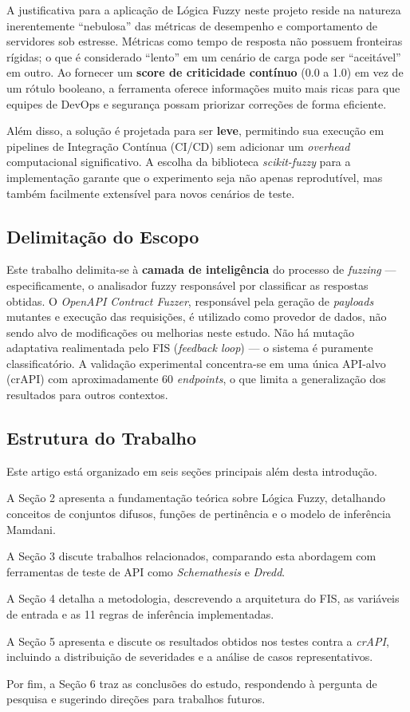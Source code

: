 A justificativa para a aplicação de Lógica Fuzzy neste projeto reside na natureza inerentemente ``nebulosa'' das métricas de desempenho e comportamento de servidores sob estresse. Métricas como tempo de resposta não possuem fronteiras rígidas; o que é considerado ``lento'' em um cenário de carga pode ser ``aceitável'' em outro. Ao fornecer um \textbf{score de criticidade contínuo} (0.0 a 1.0) em vez de um rótulo booleano, a ferramenta oferece informações muito mais ricas para que equipes de DevOps e segurança possam priorizar correções de forma eficiente.

Além disso, a solução é projetada para ser \textbf{leve}, permitindo sua execução em pipelines de Integração Contínua (CI/CD) sem adicionar um \textit{overhead} computacional significativo. A escolha da biblioteca \textit{scikit-fuzzy} para a implementação garante que o experimento seja não apenas reprodutível, mas também facilmente extensível para novos cenários de teste.

\subsection{Delimitação do Escopo}

Este trabalho delimita-se à \textbf{camada de inteligência} do processo de \textit{fuzzing} --- especificamente, o analisador fuzzy responsável por classificar as respostas obtidas. O \textit{OpenAPI Contract Fuzzer}, responsável pela geração de \textit{payloads} mutantes e execução das requisições, é utilizado como provedor de dados, não sendo alvo de modificações ou melhorias neste estudo. Não há mutação adaptativa realimentada pelo FIS (\textit{feedback loop}) --- o sistema é puramente classificatório. A validação experimental concentra-se em uma única API-alvo (crAPI) com aproximadamente 60 \textit{endpoints}, o que limita a generalização dos resultados para outros contextos.

\subsection{Estrutura do Trabalho}

Este artigo está organizado em seis seções principais além desta introdução.

A Seção 2 apresenta a fundamentação teórica sobre Lógica Fuzzy, detalhando conceitos de conjuntos difusos, funções de pertinência e o modelo de inferência Mamdani.

A Seção 3 discute trabalhos relacionados, comparando esta abordagem com ferramentas de teste de API como \textit{Schemathesis} e \textit{Dredd}.

A Seção 4 detalha a metodologia, descrevendo a arquitetura do FIS, as variáveis de entrada e as 11 regras de inferência implementadas.

A Seção 5 apresenta e discute os resultados obtidos nos testes contra a \textit{crAPI}, incluindo a distribuição de severidades e a análise de casos representativos.

Por fim, a Seção 6 traz as conclusões do estudo, respondendo à pergunta de pesquisa e sugerindo direções para trabalhos futuros.